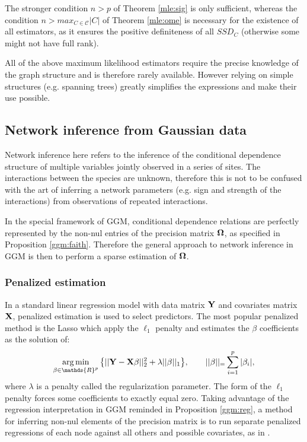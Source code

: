 The stronger condition $n>p$ of Theorem \ref{mle:sig} is only sufficient, whereas the condition $n>max_{C\in\mathcal{C}}|C|$ of Theorem \ref{mle:ome} is necessary for the existence of all estimators, as it ensures the positive definiteness of all $SSD_C$ (otherwise some might not have full rank).  

 All of the above maximum likelihood estimators require the precise knowledge of the graph structure and is therefore rarely available. However relying on simple structures (e.g. spanning trees) greatly simplifies the expressions and make their use possible.

\subsection{Network inference from Gaussian data}
\label{infGGM}
  Network inference here refers to the inference of the conditional dependence structure of multiple variables jointly observed in a series of sites. The interactions between the species are unknown, therefore this is not to be confused with the art of inferring a network parameters (e.g. sign and strength of the interactions) from observations of repeated interactions.
  
In the special framework of GGM, conditional dependence relations are perfectly represented by the non-nul entries of the precision matrix ${\boldsymbol{\Omega}}$, as specified in Proposition \ref{ggm:faith}. Therefore the general approach to network inference in GGM is then to perform a sparse estimation of ${\boldsymbol{\Omega}}$.

 \subsubsection{Penalized estimation}
 In a standard linear regression model with data matrix ${\bf Y}$ and covariates matrix ${\bf X}$, penalized estimation is used to select predictors. The most popular penalized method is the Lasso \citep{lasso} which apply the $\ell_1$ penalty and estimates the $\beta$ coefficients as the solution of:
 $$\argmin_{\beta \in \mathds{R}^p} \big\{ ||\Yb - \Xb\beta ||^2_2 + \lambda ||\beta||_1\big\}, \qquad ||\beta||_=\sum_{i=1}^p |\beta_i|,$$
 where $\lambda$ is a penalty called the regularization parameter.  The form of the $\ell_1$ penalty forces some coefficients to exactly equal zero. Taking advantage of the regression interpretation in GGM reminded in Proposition \ref{ggm:reg}, a method for inferring non-nul elements of the precision matrix is to run separate penalized regressions of each node against all others and possible covariates, as in \citet{CWL18}. \\
 
